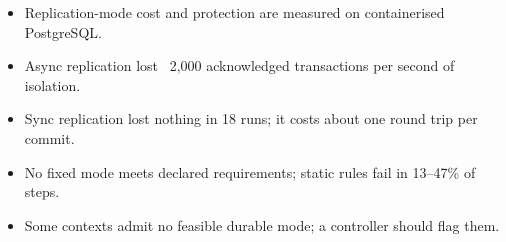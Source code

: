 \begin{itemize}
\item Replication-mode cost and protection are measured on containerised PostgreSQL.
\item Async replication lost ~2,000 acknowledged transactions per second of isolation.
\item Sync replication lost nothing in 18 runs; it costs about one round trip per commit.
\item No fixed mode meets declared requirements; static rules fail in 13--47\% of steps.
\item Some contexts admit no feasible durable mode; a controller should flag them.
\end{itemize}
